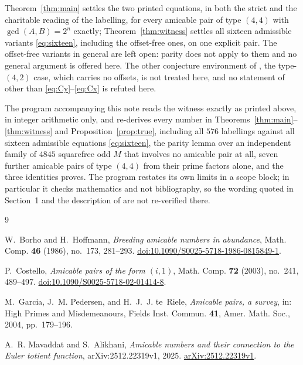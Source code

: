 \documentclass[11pt]{amsart}
\theoremstyle{remark}
\begin{document}
Theorem~\ref{thm:main} settles the two printed equations, in both the strict and
the charitable reading of the labelling, for every amicable pair of type $(4,4)$
with $\gcd(A,B)=2^n$ exactly; Theorem~\ref{thm:witness} settles all sixteen
admissible variants \eqref{eq:sixteen}, including the offset-free ones, on one
explicit pair. The offset-free variants in general are left open: parity does not
apply to them and no general argument is offered here. The other conjecture
environment of \cite{MA}, the type-$(4,2)$ case, which carries no offsets, is
not treated here, and no statement of \cite{MA} other than
\eqref{eq:Cy}--\eqref{eq:Cx} is refuted here.

The program accompanying this note reads the witness exactly as printed above,
in integer arithmetic only, and re-derives every number in
Theorems~\ref{thm:main}--\ref{thm:witness} and Proposition~\ref{prop:true},
including all $576$ labellings against all sixteen admissible equations
\eqref{eq:sixteen}, the parity lemma over an independent family of $4845$
squarefree odd $M$ that involves no amicable pair at all, seven further amicable
pairs of type $(4,4)$ from their prime factors alone, and the three identities
\cite{MA} proves. The program
restates its own limits in a scope block; in particular it checks mathematics
and not bibliography, so the wording quoted in Section~1 and the description of
\cite{MA} are not re-verified there.

\begin{thebibliography}{9}

W.~Borho and H.~Hoffmann,
\emph{Breeding amicable numbers in abundance},
Math. Comp. \textbf{46} (1986), no.~173, 281--293.
\href{https://doi.org/10.1090/S0025-5718-1986-0815849-1}
{doi:10.1090/S0025-5718-1986-0815849-1}.

P.~Costello,
\emph{Amicable pairs of the form $(i,1)$},
Math. Comp. \textbf{72} (2003), no.~241, 489--497.
\href{https://doi.org/10.1090/S0025-5718-02-01414-8}
{doi:10.1090/S0025-5718-02-01414-8}.

M.~Garcia, J.~M. Pedersen, and H.~J.~J. te~Riele,
\emph{Amicable pairs, a survey},
in: High Primes and Misdemeanours, Fields Inst. Commun. \textbf{41},
Amer. Math. Soc., 2004, pp.~179--196.

A.~R. Mavaddat and S.~Alikhani,
\emph{Amicable numbers and their connection to the Euler totient function},
arXiv:2512.22319v1, 2025.
\href{https://arxiv.org/abs/2512.22319v1}{arXiv:2512.22319v1}.

\end{thebibliography}
\end{document}
